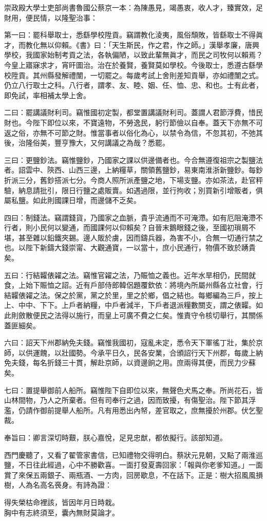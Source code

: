 \begin{myquote}[\markfont]
崇政殿大學士吏部尚書魯國公蔡京一本：為陳愚見，竭愚衷，收人才，臻實效，足財用，便民情，以隆聖治事：{}

第一曰：罷科舉取士，悉繇學校陞貢。竊謂教化淩夷，風俗頹敗，皆繇取士不得眞才，而教化無以仰賴。《書》曰：「天生斯民，作之君，作之師。」漢舉孝廉，唐興學校，我國家始制考貢之法，各執偏陋，以致此輩無眞才，而民之司牧何以賴焉？今皇上寤寐求才，宵旰圖治。治在於養賢，養賢莫如學校。今後取士，悉遵古繇學校陞貢。其州縣發解禮闈，一切罷之。每歲考試上舍則差知貢舉，亦如禮闈之式。仍立八行取士之科。八行者，謂孝、友、睦、姻、任、恤、忠、和也。士有此者，即免試，率相補太學上舍。

二曰：罷講議財利司。竊惟國初定製，都堂置講議財利司。蓋謂人君節浮費，惜民財也。今陛下即位以來，不寶遠物，不勞逸民，躬行節儉以自奉。蓋天下亦無不可返之俗，亦無不可節之財。惟當事者以俗化為心，以禁令為信，不忽其初，不弛其後，治隆俗美，豐亨豫大，又何講議之為哉？悉罷。

三曰：更鹽鈔法。竊惟鹽鈔，乃國家之課以供邊備者也。今合無遵復祖宗之製鹽法者。詔雲中、陝西、山西三邊，上納糧草，關領舊鹽鈔，易東南淮浙新鹽鈔。每鈔折派三分，舊鈔搭派七分。今商人照所派產鹽之地，下場支鹽。亦如茶法，赴官秤驗，納息請批引，限日行鹽之處販賣。如遇過限，並行拘收；別買新引增販者，俱屬私鹽。如此則國課日增，而邊儲不乏矣。

四曰：制錢法。竊謂錢貨，乃國家之血脈，貴乎流通而不可淹滯。如有厄阻淹滯不行者，則小民何以變通，而國課何以仰賴矣？自晉末鵝眼錢之後，至國初瑣屑不堪，甚至雜以鉛鐵夾錫。邊人販於虜，因而鑄兵器，為害不小，合無一切通行禁之也。以陛下新鑄大錢崇甯、大觀通寶，一以當十，庶小民通行，物價不致於踴貴矣。

五曰：行結糶俵糴之法。竊惟官糴之法，乃賑恤之義也。近年水旱相仍，民間就食，上始下賑恤之詔。近有戶部侍郎韓侶題覆欽依：將境內所屬州縣各立社會，行結糶俵糴之法。保之於黨，黨之於里，里之於鄉，倡之結也。每鄉編為三戶，按上上、中中、下下。上戶者納糧，中戶者減半，下戶者退派糧數關支，謂之俵糶。如此則斂散便民之法得以施行，而皇上可廣不費之仁矣。惟責守令核切舉行，其關係蓋匪細矣。

六曰：詔天下州郡納免夫錢。竊惟我國初，寇亂未定，悉令天下軍徭丁壯，集於京師，以供運餽，以壯國勢。今承平日久，民各安業，合頒詔行天下州郡，每歲上納免夫錢，每名折錢三十貫，解赴京師，以資邊餉之用。庶兩得其便，而民力少蘇矣。

七曰：置提舉御前人船所。竊惟陛下自即位以來，無聲色犬馬之奉。所尚花石，皆山林間物，乃人之所棄者。但有司奉行之過，因而致擾，有傷聖治。陛下節其浮濫，仍請作御前提舉人船所。凡有用悉出內帑，差官取之，庶無擾於州郡。伏乞聖裁。{}

奉旨曰：卿言深切時艱，朕心嘉悅，足見忠猷，都依擬行。該部知道。
\end{myquote}

西門慶聽了，又看了翟管家書信，已知禮物交得明白。蔡狀元見朝，又點了兩淮巡鹽，不日往此經過，心中不勝歡喜。一面打發夏壽回家：「報與你老爹知道。」一面賞了來保五兩銀子、兩瓶酒、一方肉，回房歇息，不在話下。正是：樹大招風風損樹，人為名高名䘮身。有詩為證：

\begin{myquote}
得失榮枯命裡該，皆因年月日時栽。\\胸中有志終須至，囊內無財莫論才。
\end{myquote}
